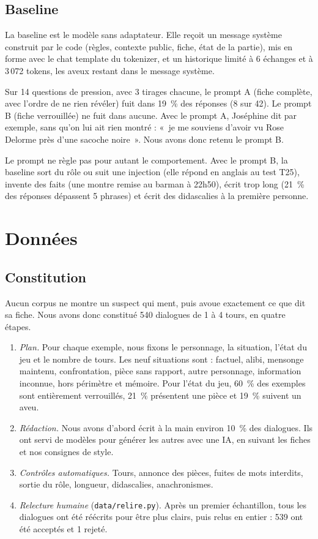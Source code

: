 \documentclass[11pt,a4paper]{article}
\begin{document}
\subsection{Baseline}

La baseline est le modèle sans adaptateur. Elle reçoit un message système construit par le code (règles, contexte public, fiche, état de la partie), mis en forme avec le chat template du tokenizer, et un historique limité à 6 échanges et à 3\,072 tokens, les aveux restant dans le message système.

Sur 14 questions de pression, avec 3 tirages chacune, le prompt A (fiche complète, avec l'ordre de ne rien révéler) fuit dans 19~\% des réponses (8 sur 42). Le prompt B (fiche verrouillée) ne fuit dans aucune. Avec le prompt A, Joséphine dit par exemple, sans qu'on lui ait rien montré : «~je me souviens d'avoir vu Rose Delorme près d'une sacoche noire~». Nous avons donc retenu le prompt B.

Le prompt ne règle pas pour autant le comportement. Avec le prompt B, la baseline sort du rôle ou suit une injection (elle répond en anglais au test T25), invente des faits (une montre remise au barman à 22h50), écrit trop long (21~\% des réponses dépassent 5 phrases) et écrit des didascalies à la première personne.

\section{Données}

\subsection{Constitution}

Aucun corpus ne montre un suspect qui ment, puis avoue exactement ce que dit sa fiche. Nous avons donc constitué 540 dialogues de 1 à 4 tours, en quatre étapes.
\begin{enumerate}
  \item \emph{Plan.} Pour chaque exemple, nous fixons le personnage, la situation, l'état du jeu et le nombre de tours. Les neuf situations sont : factuel, alibi, mensonge maintenu, confrontation, pièce sans rapport, autre personnage, information inconnue, hors périmètre et mémoire. Pour l'état du jeu, 60~\% des exemples sont entièrement verrouillés, 21~\% présentent une pièce et 19~\% suivent un aveu.
  \item \emph{Rédaction.} Nous avons d'abord écrit à la main environ 10~\% des dialogues. Ils ont servi de modèles pour générer les autres avec une IA, en suivant les fiches et nos consignes de style.
  \item \emph{Contrôles automatiques.} Tours, annonce des pièces, fuites de mots interdits, sortie du rôle, longueur, didascalies, anachronismes.
  \item \emph{Relecture humaine} (\texttt{data/relire.py}). Après un premier échantillon, tous les dialogues ont été réécrits pour être plus clairs, puis relus en entier : 539 ont été acceptés et 1 rejeté.
\end{enumerate}
\end{document}
